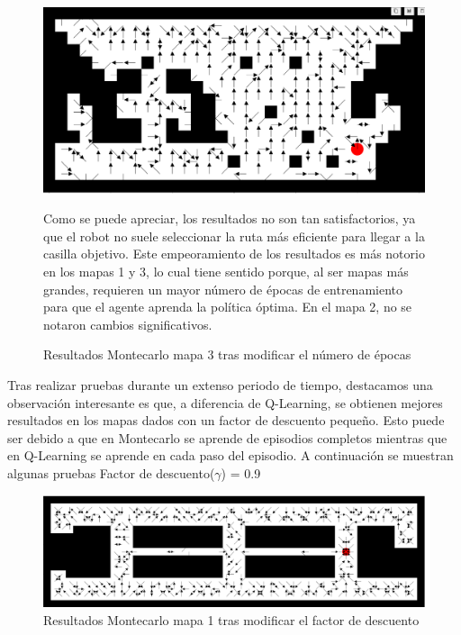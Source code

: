 \documentclass[conference,a4paper]{IEEEtran}
\begin{document}
\begin{figure}[h]
  \includegraphics[scale=0.18]{report/Montecarlo3_epocas.png}
  \caption{Resultados Montecarlo mapa 3 tras modificar el número de épocas}
  \label{fig:Montecarlo3_epocas}
  \vspace{0.5cm}
  Como se puede apreciar, los resultados no son tan satisfactorios, ya que el robot no suele seleccionar la ruta más eficiente para llegar a la casilla objetivo. 
  Este empeoramiento de los resultados es más notorio en los mapas 1 y 3, lo cual tiene sentido porque, al ser mapas más grandes, requieren un mayor número de épocas de entrenamiento para que el agente aprenda la política óptima. En el mapa 2, no se notaron cambios significativos.\newline
\end{figure}

Tras realizar pruebas durante un extenso periodo de tiempo, destacamos una observación interesante es que, a diferencia de Q-Learning, se obtienen mejores resultados en los mapas dados con un factor de descuento pequeño. Esto puede ser debido a que en Montecarlo se aprende de episodios completos mientras que en Q-Learning se aprende en cada paso del episodio. A continuación se muestran algunas pruebas Factor de descuento($\gamma$) = 0.9\newline\newline\newline\newline
\begin{figure}[h]
  \centering
  \includegraphics[scale=0.18]{report/Montecarlo0.9.png}
  \caption{Resultados Montecarlo mapa 1 tras modificar el factor de descuento}
  \label{fig:Montecarlo0.9}
\end{figure}
\end{document}
